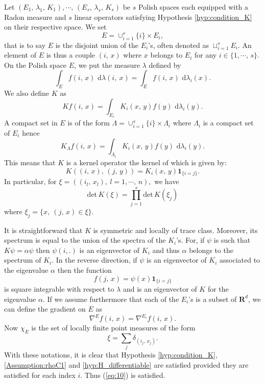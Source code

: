 \documentclass[11pt,a4paper]{amsart}
\begin{document}
Let $(E_1,\, \lambda_1, \, K_1),\cdots, \, (E_s, \,\lambda_s,\, K_s)$
be $s$ Polish spaces each equipped with a Radon measure and $s$ linear
operators satisfying Hypothesis \ref{hyp:condition_K} on their
respective space. We set
\begin{equation*}
  E=\cup_{i=1}^s \{i\}\times E_i,
\end{equation*}
that is to say $E$ is the disjoint union of the $E_i$'s, often denoted
as $\sqcup_{i=1}^s E_i$. An element of $E$ is thus a couple $(i,\, x)$
where $x$ belongs to $E_i$ for any $i\in \{1,\cdots,\, s\}.$ On the
Polish space $E$, we put the measure $\lambda$ defined by
\begin{equation*}
  \int_E f(i,\, x){\text{ d}}\lambda(i,\ x)=\int_E f(i,\, x){\text{ d}}\lambda_i(x).
\end{equation*}
We also define $K$ as
\begin{equation*}
  Kf(i,\, x)=\int_{E_i} K_i(x,\, y)f(y){\text{ d}}\lambda_i(y).
\end{equation*}
A compact set in $E$ is of the form $\Lambda=\cup_{i=1}^s \{i\}\times
\Lambda_i$ where $\Lambda_i$ is a compact set of $E_i$ hence
\begin{equation*}
  K_\Lambda f(i,\, x)=\int_{\Lambda_i} K_i(x,\, y)f(y){\text{ d}}\lambda_i(y).
\end{equation*}
This means that $K$ is a kernel operator the kernel of which is given
by:
\begin{equation}\label{eq:17}
  K((i,\, x),\, (j,\, y))=K_i(x,\, y) {{\mathbf 1}}_{\{i=j\}}.
\end{equation}
In particular, for $\xi=((i_l,\, x_l),\ l=1,\cdots,\, n),$ we have
\begin{equation*}
  {{\text{det}}} \,K(\xi)=\prod_{j=1}^s {{\text{det}}} \, K(\xi_j)
\end{equation*}
where $\xi_j=\{x,\ (j,\, x)\in \xi\}.$

It is straightforward that $K$ is symmetric and locally of trace class. Moreover,
its spectrum is equal to the union of the spectra of the $K_i$'s. For,
if $\psi$ is such that $K\psi=\alpha\psi$ then $\psi(i,.)$ is an
eigenvector of $K_i$ and thus $\alpha$ belongs to the spectrum of
$K_i$. In the reverse direction, if $\psi$ is an eigenvector of $K_i$
associated to the eigenvalue $\alpha$ then the function
\begin{equation*}
  f(j,\, x)=\psi(x){{\mathbf 1}}_{\{i=j\}}
\end{equation*}
is square integrable with respect to $\lambda$ and is an eigenvector
of $K$ for the eigenvalue $\alpha.$ If we assume furthermore that each
of the $E_i$'s is a subset of ${{\mathbf R}}^d$, we can define the gradient on
$E$ as
\begin{equation*}
  \nabla^E f(i,\, x)=\nabla^{E_i}f(i,\, x).
\end{equation*}
Now $\chi_E$ is the set of locally finite point measures of the form
\begin{equation*}
  \xi=\sum_j \delta_{(i_j,\, x_j)}.
\end{equation*}
With these notations, it is clear that Hypothesis
\ref{hyp:condition_K}, \ref{Assumption:rhoC1} and
\ref{hyp:H_differentiable} are satisfied provided they are satisfied
for each index $i$. Thus (\ref{eq:10}) is satisfied.
\end{document}

